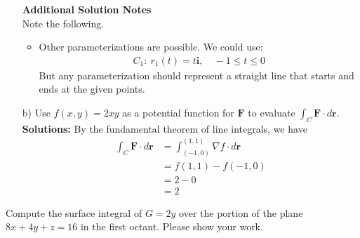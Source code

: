 \begin{enumerate}
{            \textbf{Additional Solution Notes}\\
            Note the following.
            \begin{itemize}
                \item Other parameterizations are possible. We could use: 
                \begin{align}
                    C_1: \ r_1(t) = t\mathbf{i}, \quad -1 \le t \le 0
                \end{align}
                But any parameterization should represent a straight line that starts and ends at the given points. 
            \end{itemize}
            } 
            \else 
            \vspace{9cm}

            \fi 

            \item[b)] Use $f(x,y) = 2xy$ as a potential function for $\mathbf{F}$ to evaluate $\int_C \mathbf{F}\cdot d\mathbf{r}$.
            \ifnum {} {\color{DarkBlue} \\[12pt] 
            \textbf{Solutions:} 
            By the fundamental theorem of line integrals, we have
            \begin{align}
                \int_C \mathbf{F}\cdot d\mathbf{r}
                &= \int_{(-1,0)}^{(1,1)} \nabla f\cdot d\mathbf{r} \\
                &= f(1,1) - f(-1,0) \\
                &= 2 - 0 \\
                &= 2
            \end{align}
            } 
            \else 
            \fi

    \end{enumerate}      
\fi 



\ifnum {}

    \question[4]{} Compute the surface integral of $G = 2y $ over the portion of the plane $8x + 4y + z = 16$ in the first octant. Please show your work.  
    
